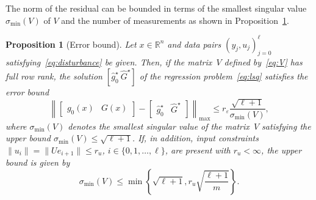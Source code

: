 \documentclass[a4paper, reqno]{amsart}
\newcommand{\dd}{\ell}
\newtheorem{proposition}[theorem]{Proposition}
\begin{document}
The norm of the residual can be bounded in terms of the smallest singular value $\sigma_{\min}(V)$ of $V$ and the number of measurements as shown in Proposition~\ref{prop:approx:error}.
\begin{proposition}[Error bound]\label{prop:approx:error}
    Let $x\in\mathbb R^n$ and data pairs $(y_j, u_j)_{j=0}^{\dd}$ satisfying~\eqref{eq:disturbance} be given. 
    Then, if the matrix~$V$ defined by~\eqref{eq:V} has full row rank, the solution $[\hat{g}_0^\star\ \widehat{G}^\star]$ of the regression problem~\eqref{eq:lsq} satisfies the error bound
    \begin{equation}\label{eq:bound:approx_Prop1}
        \left\lVert  \begin{bmatrix}
            g_0(x) & G(x)
        \end{bmatrix} - \begin{bmatrix}
            \hat{g}_0^\star & \widehat{G}^\star \end{bmatrix}\right\rVert  _\mathrm{max} \leq r_\varepsilon  \frac{\sqrt{\dd+1}}{\sigma_{\min}(V)},
    \end{equation}
    where $\sigma_{\min}(V)$ denotes the smallest singular value of the matrix~$V$ satisfying the upper bound $\sigma_\mathrm{min}(V) \leq \sqrt{\dd+1}$.
    If, in addition, input constraints $\lVert u_{i} \rVert = \lVert U e_{i+1} \rVert \leq r_u$, $i \in \{0,1,\ldots,\dd\}$, are present with $r_u < \infty$, the upper bound is given by 
    \begin{equation}\label{eq:bound:control-constraints}
        \sigma_\mathrm{min}(V) \leq \min\left\lbrace\sqrt{\dd+1}, r_u \sqrt{\frac{\dd+1}{m}}\right\rbrace.    
    \end{equation}
\end{proposition}
\end{document}
